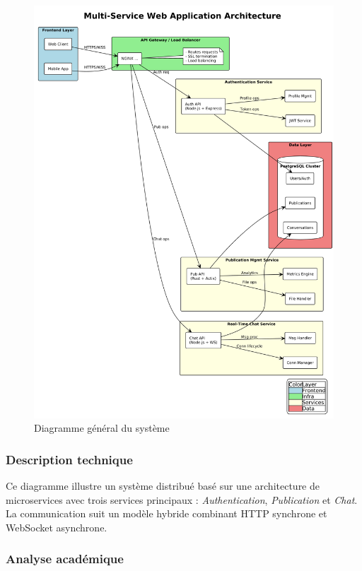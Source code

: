 \documentclass{rapportPfe}
\begin{document}
\begin{figure}[htbp]
    \centering
    \includegraphics[width=1.0\textwidth]{diagrams/diagram.png}
    \caption{Diagramme général du système}
    \label{fig:diagram-general}
\end{figure}

\subsubsection*{Description technique}

Ce diagramme illustre un système distribué basé sur une architecture de microservices avec trois services principaux : \textit{Authentication}, \textit{Publication} et \textit{Chat}. La communication suit un modèle hybride combinant HTTP synchrone et WebSocket asynchrone.

\subsubsection*{Analyse académique}
\end{document}
